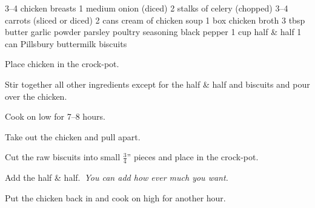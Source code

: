 \dishtype{\soup}
\begin{ingreds}
    3--4 chicken breasts
    1 medium onion (diced)
    2 stalks of celery (chopped)
    3--4 carrots (sliced or diced)
    2 cans cream of chicken soup
    1 box chicken broth
    3 tbsp butter
    garlic powder
    parsley
    poultry seasoning
    black pepper
    1 cup half \& half
    1 can Pillsbury\textsuperscript{\textregistered} buttermilk biscuits
\end{ingreds}
\begin{method}
    Place chicken in the crock-pot.\par
    Stir together all other ingredients except for the half \& half and biscuits and pour over the chicken.\par
    Cook on low for 7--8 hours.\par
    Take out the chicken and pull apart.\par
    Cut the raw biscuits into small $\frac{3}{4}$'' pieces and place in the crock-pot.\par
    Add the half \& half.\ \emph{You can add how ever much you want.}\par
    Put the chicken back in and cook on high for another hour.
\end{method}